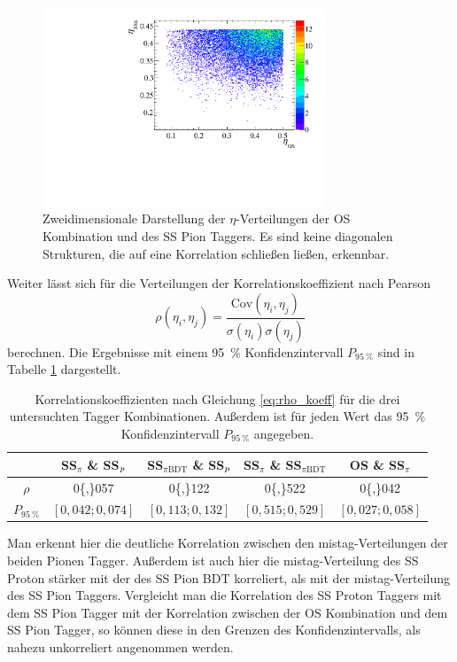 \begin{figure}[htbp]
	\centering
		\includegraphics[width=0.75\textwidth]{fig/SSpi_OS.pdf}
	\caption{Zweidimensionale Darstellung der $\eta$-Verteilungen der OS Kombination und des SS Pion Taggers. Es sind keine diagonalen Strukturen, die auf eine Korrelation schließen ließen, erkennbar.}
	\label{fig:SSpi_OS} 
\end{figure}
Weiter lässt sich für die Verteilungen der Korrelationskoeffizient nach Pearson \cite{Blobel}
\begin{equation}
\rho(\eta_i,\eta_j)=\frac{\text{Cov}(\eta_i,\eta_j)}{\sigma(\eta_i)\sigma(\eta_j)}\label{eq:rho_koeff}
\end{equation}
berechnen. Die Ergebnisse mit einem \SI{95}{\%} Konfidenzintervall $P_{\SI{95}{\%}}$ sind in Tabelle \ref{tab:pearson_coeff} dargestellt.
\begin{table}[htbp]
	\centering
	\caption{Korrelationskoeffizienten nach Gleichung \eqref{eq:rho_koeff} für die drei untersuchten Tagger Kombinationen. Außerdem ist für jeden Wert das \SI{95}{\%} Konfidenzintervall $P_{\SI{95}{\%}}$ angegeben.}
	\label{tab:pearson_coeff}
	\begin{tabular}{ccccc}
	\toprule
         			& SS$_\pi$ \& SS$_{p}$ & SS$_{\pi\text{BDT}}$ \& SS$_{p}$ & SS$_\pi$ \& SS$_{\pi\text{BDT}}$ & OS \& SS$_\pi$ \\ 
			\midrule
       $\rho$		& \num{0{,}057} & \num{0{,}122} & \num{0{,}522} & \num{0{,}042} \\ 
       $P_{\SI{95}{\%}}$  & $[0{,}042;0{,}074]$ & $[0{,}113;0{,}132]$ & $[0{,}515;0{,}529]$ & $[0{,}027;0{,}058]$  \\ 
       \bottomrule
	\end{tabular}
\end{table}
Man erkennt hier die deutliche Korrelation zwischen den mistag-Verteilungen der beiden Pionen Tagger. Außerdem ist auch hier die mistag-Verteilung des SS Proton stärker mit der des SS Pion BDT korreliert, als mit der mistag-Verteilung des SS Pion Taggers. Vergleicht man die Korrelation des SS Proton Taggers mit dem SS Pion Tagger mit der Korrelation zwischen der OS Kombination und dem SS Pion Tagger, so können diese in den Grenzen des Konfidenzintervalls, als nahezu unkorreliert angenommen werden.

